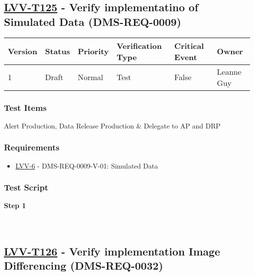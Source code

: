 \hypertarget{lvv-t125---verify-implementatino-of-simulated-data-dms-req-0009}{%
\subsection{\texorpdfstring{\href{https://jira.lsstcorp.org/secure/Tests.jspa\#/testCase/LVV-T125}{LVV-T125}
- Verify implementatino of Simulated Data
(DMS-REQ-0009)}{LVV-T125 - Verify implementatino of Simulated Data (DMS-REQ-0009)}}\label{lvv-t125---verify-implementatino-of-simulated-data-dms-req-0009}}

\begin{longtable}[]{@{}llllll@{}}
\toprule
Version & Status & Priority & Verification Type & Critical Event &
Owner\tabularnewline
\midrule
\endhead
1 & Draft & Normal & Test & False & Leanne Guy\tabularnewline
\bottomrule
\end{longtable}

\hypertarget{test-items-25}{%
\subsubsection{Test Items}\label{test-items-25}}

Alert Production, Data Release Production \& Delegate to AP and DRP

\hypertarget{requirements-25}{%
\subsubsection{Requirements}\label{requirements-25}}

\begin{itemize}
\tightlist
\item
  \href{https://jira.lsstcorp.org/browse/LVV-6}{LVV-6} -
  DMS-REQ-0009-V-01: Simulated Data
\end{itemize}

\hypertarget{test-script-25}{%
\subsubsection{Test Script}\label{test-script-25}}

\textbf{Step 1}\\
~\\
~\\

\hypertarget{lvv-t126---verify-implementation-image-differencing-dms-req-0032}{%
\subsection{\texorpdfstring{\href{https://jira.lsstcorp.org/secure/Tests.jspa\#/testCase/LVV-T126}{LVV-T126}
- Verify implementation Image Differencing
(DMS-REQ-0032)}{LVV-T126 - Verify implementation Image Differencing (DMS-REQ-0032)}}\label{lvv-t126---verify-implementation-image-differencing-dms-req-0032}}

